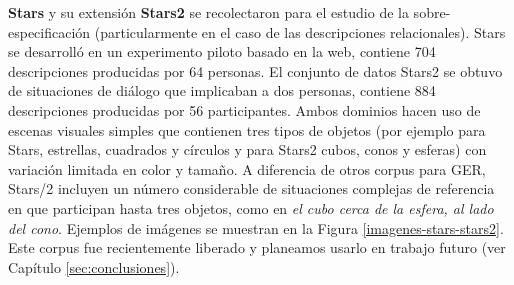 \label{sec:corpusSTARS}
{\bf Stars} \cite{Paraboni2016} y su extensi\'on {\bf Stars2} se recolectaron para el estudio de la sobre-especificaci\'on (particularmente en el caso de las descripciones relacionales). Stars se desarroll\'o en un experimento piloto basado en la web, contiene 704 descripciones producidas por 64 personas. El conjunto de datos Stars2 se obtuvo de situaciones de di\'alogo que implicaban a dos personas, contiene 884 descripciones producidas por 56 participantes. Ambos dominios hacen uso de escenas visuales simples que contienen tres tipos de objetos (por ejemplo para Stars, estrellas, cuadrados y c\'irculos y para Stars2 cubos, conos y esferas) con variaci\'on limitada en color y tama\~no. A diferencia de otros corpus para GER, Stars/2 incluyen un n\'umero considerable de situaciones complejas de referencia en que participan hasta tres objetos, como en {\it el cubo cerca de la esfera, al lado del cono}. Ejemplos de im\'agenes se muestran en la Figura \ref{imagenes-stars-stars2}. Este corpus fue recientemente liberado y planeamos usarlo en trabajo futuro (ver Cap\'itulo \ref{sec:conclusiones}).\\

